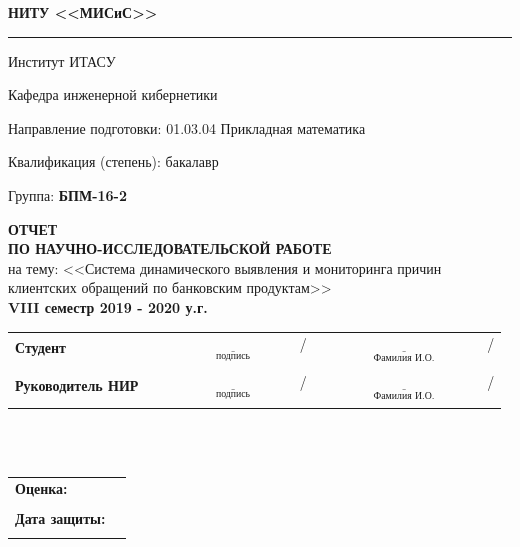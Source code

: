 \documentclass[a4paper,12pt,preview]{report} %
\newcommand{\doublerule}[1][.4pt]{%
	\noindent
	\makebox[0pt][l]{\rule[.7ex]{\linewidth}{#1}}%
	\rule[.3ex]{\linewidth}{#1}}
\begin{document}
	\linespread{1.3}
	
	
	\begin{center}
		\textbf{НИТУ <<МИСиС>>}
	\end{center}

	\doublerule
	
	\noindent
	Институт ИТАСУ
	
	\noindent
	Кафедра инженерной кибернетики
	
	\noindent
	Направление подготовки: 01.03.04 Прикладная математика
	
	\noindent
	Квалификация (степень): бакалавр
	
	\noindent
	Группа: \textbf{БПМ-16-2}
	
	\hfill \break
	
	\begin{center}
		\huge\textbf{ОТЧЕТ}\\
		\large\textbf{ПО НАУЧНО-ИССЛЕДОВАТЕЛЬСКОЙ РАБОТЕ} \\
		на тему: <<Система динамического выявления и мониторинга причин клиентских обращений по банковским продуктам>>\\
		\textbf{VIII семестр 2019 - 2020 у.г.}
	\end{center}
	
	\hfill \break
	\hfill \break
	\normalsize{ 
		\begin{tabular}{lccc}
			\textbf{Студент} &  \text{ } & $\underset{\text{подпись}}{\underline{\hspace{4cm}}}$/ & $\underset{\text{Фамилия И.О.}}{\underline{\hspace{5cm}}}$/ \\\\
			\textbf{Руководитель НИР} &  \text{ } & $\underset{\text{подпись}}{\underline{\hspace{4cm}}}$/ & $\underset{\text{Фамилия И.О.}}{\underline{\hspace{5cm}}}$/ \\\\
		\end{tabular}
	}\\\\
	
	\noindent
	\normalsize{ 
		\begin{tabular}{lc}
			\textbf{Оценка:} &  \underline{\hspace{7cm}}\\\\
			\textbf{Дата защиты:} & \underline{\hspace{7cm}}\\\\
		\end{tabular}
	}\\\\
	
\end{document}
